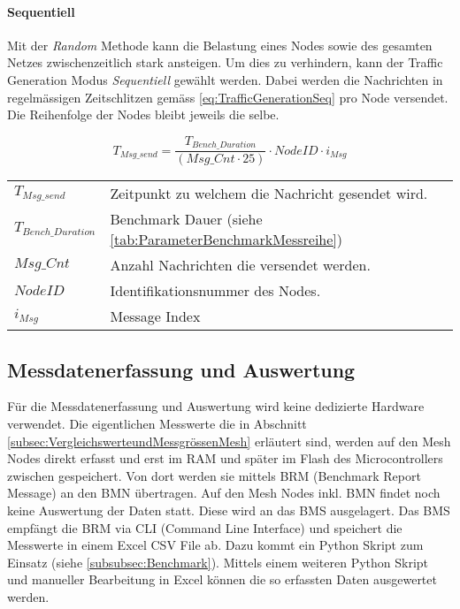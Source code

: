 \paragraph{Sequentiell}\label{par:Sequentiell}
Mit der \textit{Random} Methode kann die Belastung eines Nodes sowie des gesamten Netzes zwischenzeitlich stark ansteigen.
Um dies zu verhindern, kann der Traffic Generation Modus \textit{Sequentiell} gewählt werden.
Dabei werden die Nachrichten in regelmässigen Zeitschlitzen gemäss \ref{eq:TrafficGenerationSeq} pro Node versendet. Die Reihenfolge der Nodes bleibt jeweils die selbe.


\begin{equation}\label{eq:TrafficGenerationSeq}
T_{Msg\_send} =  \frac{T_{Bench\_Duration}}{(Msg\_Cnt \cdot 25)} \cdot NodeID \cdot i_{Msg}
\end{equation}

\begin{small}
\begin{center}
\begin{tabular}{ll}
$T_{Msg\_send}$ & Zeitpunkt zu welchem die Nachricht gesendet wird.\\
$T_{Bench\_Duration}$ & Benchmark Dauer (siehe \ref{tab:ParameterBenchmarkMessreihe})\\
$Msg\_Cnt$ & Anzahl Nachrichten die versendet werden.\\
$NodeID$ &Identifikationsnummer des Nodes. \\
$i_{Msg}$ & Message Index
\end{tabular}
\end{center}
\end{small}





\subsection{Messdatenerfassung und Auswertung}\label{subsec:MessdatenerfassungundAuswertung}

Für die Messdatenerfassung und Auswertung wird keine dedizierte Hardware verwendet. Die eigentlichen Messwerte die in Abschnitt \ref{subsec:VergleichswerteundMessgrössenMesh} erläutert sind, werden auf den Mesh Nodes direkt erfasst und erst im RAM und später im Flash des Microcontrollers zwischen gespeichert. Von dort werden sie mittels BRM (Benchmark Report Message) an den BMN übertragen.
Auf den Mesh Nodes inkl. BMN findet noch keine Auswertung der Daten statt.
Diese wird an das BMS ausgelagert.
Das BMS empfängt die BRM via CLI (Command Line Interface) und speichert die Messwerte in einem Excel CSV File ab. Dazu kommt ein Python Skript zum Einsatz (siehe \ref{subsubsec:Benchmark}).
Mittels einem weiteren Python Skript und manueller Bearbeitung in Excel können die so erfassten Daten ausgewertet werden.


